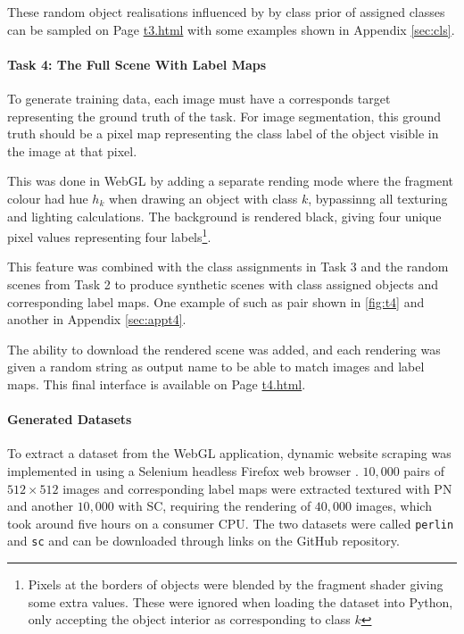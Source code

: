 \documentclass[12pt,fleqn]{article}
\begin{document}
These random object realisations influenced by by class prior of assigned classes can be sampled on Page \href{https://www.student.dtu.dk/~s183911/proj/webgl-site/t3.html}{t3.html} with some examples shown in Appendix \ref{sec:cls}.


\paragraph{Task 4: The Full Scene With Label Maps}
To generate training data, each image must have a corresponds target representing the ground truth of the task.
For image segmentation, this ground truth should be a pixel map representing the class label of the object visible in the image at that pixel.

This was done in WebGL by adding a separate rending mode where the fragment colour had hue $h_k$ when drawing an object with class $k$, bypassinng all texturing and lighting calculations.
The background is rendered black, giving four unique pixel values representing four labels\footnote{Pixels at the borders of objects were blended by the fragment shader giving some extra values. These were ignored when loading the dataset into Python, only accepting the object interior as corresponding to class $k$}.

This feature was combined with the class assignments in Task 3 and the random scenes from Task 2 to produce synthetic scenes with class assigned objects and corresponding label maps.
One example of such as pair shown in \ref{fig:t4} and another in Appendix \ref{sec:appt4}.

The ability to download the rendered scene was added, and each rendering was given a random string as output name to be able to match images and label maps.
This final interface is available on Page \href{https://www.student.dtu.dk/~s183911/proj/webgl-site/t4.html}{t4.html}.

\paragraph{Generated Datasets}
To extract a dataset from the WebGL application, dynamic website scraping was implemented in  using a Selenium headless Firefox web browser \cite{selenium2022docs}.
$10,000$ pairs of $512\times 512$ images and corresponding label maps were extracted textured with PN and another $10,000$ with SC, requiring the rendering of $40,000$ images, which took around five hours on a consumer CPU.
The two datasets were called \texttt{perlin} and \texttt{sc} and can be downloaded through links on the GitHub repository.
\end{document}
